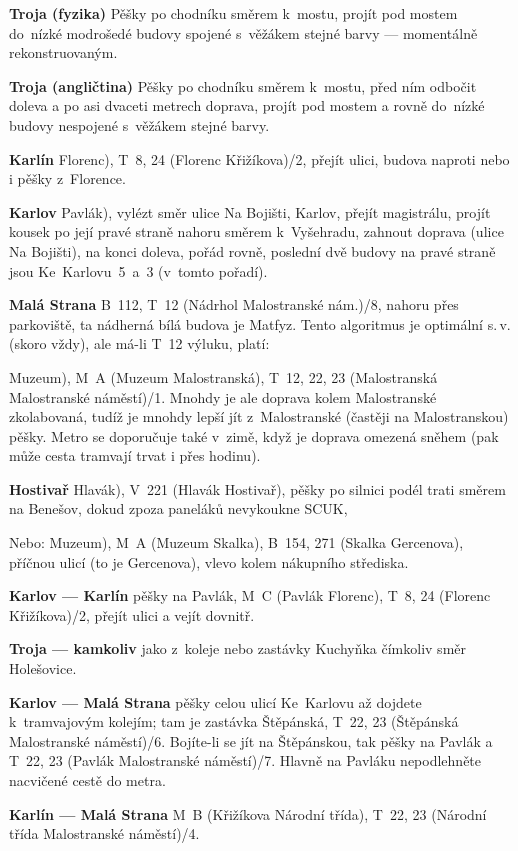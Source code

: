 \bigskip
\textbf{Troja (fyzika)} Pěšky po chodníku směrem k~mostu, projít
pod mostem do~nízké modrošedé budovy spojené s~věžákem stejné
barvy --- momentálně rekonstruovaným.

\textbf{Troja (angličtina)} Pěšky po chodníku směrem k~mostu, před
ním odbočit doleva a po asi dvaceti metrech doprava, projít pod
mostem a rovně do~nízké budovy nespojené s~věžákem stejné barvy.

\textbf{Karlín} 
\startpath Florenc), T~8, 24 (Florenc \ra
Křižíkova)/2, přejít ulici, budova naproti nebo i pěšky
z~Florence.

\textbf{Karlov} 
\startpath Pavlák), vylézt směr ulice Na Bojišti,
Karlov, přejít magistrálu, projít kousek po její pravé straně
nahoru směrem k~Vyšehradu, zahnout doprava (ulice Na Bojišti), na
konci doleva, pořád rovně, poslední dvě budovy na pravé straně
jsou Ke~Karlovu~{5~a~3} (v~tomto pořadí).

\textbf{Malá Strana} 
B~112, T~12 (Nádrhol \ra Malostranské
nám.)/8, nahoru přes parkoviště, ta nádherná bílá budova je Matfyz.
Tento algoritmus je optimální s.$\,$v. (skoro vždy), ale má-li
T~12 výluku, platí:

\startpath Muzeum), M~A (Muzeum \ra
Malostranská), T~12, 22, 23 (Malostranská \ra Malostranské
náměstí)/1. Mnohdy je ale doprava kolem Malostranské zkolabovaná,
tudíž je mnohdy lepší jít z~Malostranské (častěji na
Malostranskou) pěšky. Metro se doporučuje také v~zimě, když je
doprava omezená sněhem (pak může cesta tramvají trvat i přes
hodinu).

\textbf {Hostivař} 
\startpath Hlavák), V~221 (Hlavák \ra
Hostivař), pěšky po silnici podél trati směrem na Benešov, dokud
zpoza paneláků nevykoukne SCUK,

Nebo:  \startpath Muzeum), M~A (Muzeum \ra Skalka), B~154, 271
(Skalka \ra
Gercenova), %
příčnou ulicí (to je Gercenova), vlevo kolem nákupního střediska.

\bigskip

\textbf {Karlov --- Karlín}
 pěšky na Pavlák, M~C (Pavlák \ra
Florenc), T~8, 24 (Florenc \ra Křižíkova)/2, přejít ulici a vejít
dovnitř.

\textbf{Troja --- kamkoliv}
 jako z~koleje nebo zastávky Kuchyňka
čímkoliv směr Holešovice.

\textbf{Karlov --- Malá Strana}
 pěšky celou ulicí Ke~Karlovu až
dojdete k~tramvajovým kolejím; tam je zastávka Štěpánská, T~22, 23
(Štěpánská \ra Malostranské náměstí)/6. Bojíte-li se jít na
Štěpánskou, tak pěšky na Pavlák a T~22, 23 (Pavlák \ra
Malostranské náměstí)/7. Hlavně na Pavláku nepodlehněte nacvičené
cestě do metra.

\textbf{Karlín --- Malá Strana}
 M~B (Křižíkova \ra Národní třída),
T~22, 23 (Národní třída \ra Malostranské náměstí)/4.